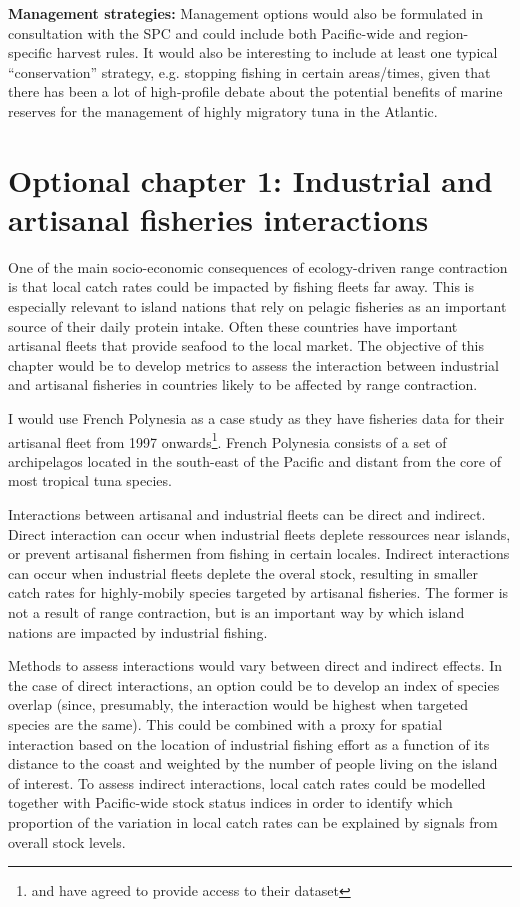 \documentclass{article}
\begin{document}
\noindent\textbf{Management strategies:} Management options would also be
formulated in consultation with the SPC and could include both
Pacific-wide and region-specific harvest rules. It would also be
interesting to include at least one typical ``conservation''
strategy, e.g. stopping fishing in certain areas/times, given that
there has been a lot of high-profile debate about the potential
benefits of marine reserves for the management of highly migratory tuna
in the Atlantic.


\newpage
\section*{Optional chapter 1: Industrial and artisanal fisheries interactions}

One of the main socio-economic consequences of ecology-driven range
contraction is that local catch rates could be impacted by fishing
fleets far away. This is especially relevant to island nations that
rely on pelagic fisheries as an important source of their daily
protein intake. Often these countries have important artisanal fleets
that provide seafood to the local market. The objective of this
chapter would be to develop metrics to assess the interaction between
industrial and artisanal fisheries in countries likely to be affected
by range contraction.

I would use French Polynesia as a case study as they have fisheries
data for their artisanal fleet from 1997 onwards\footnote{and have
agreed to provide access to their dataset}. French Polynesia consists
of a set of archipelagos located in the south-east of the Pacific and distant
from the core of most tropical tuna species.

Interactions between artisanal and industrial fleets can be direct
and indirect. Direct interaction can occur when industrial fleets
deplete ressources near islands, or prevent artisanal fishermen from
fishing in certain locales. Indirect interactions can occur when
industrial fleets deplete the overal stock, resulting in smaller catch
rates for highly-mobily species targeted by artisanal fisheries. The
former is not a result of range contraction, but is an
important way by which island nations are impacted by industrial fishing.

Methods to assess interactions would vary between direct and indirect
effects. In the case of direct interactions, an option could be to
develop an index of species overlap (since, presumably, the interaction would be
highest when targeted species are the same). This could be combined
with a proxy for spatial interaction based on the location of industrial fishing
effort as a function of its distance to the coast and weighted by the
number of people living on the island of interest. To assess indirect interactions, local catch rates could be modelled together
with Pacific-wide stock status indices in order to identify which
proportion of the variation in local catch rates can be explained by
signals from overall stock levels.
\end{document}
